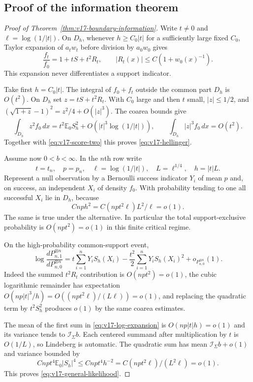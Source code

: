 \subsection{Proof of the information theorem}
\begin{proof}[Proof of Theorem~\ref{thm:v17-boundary-information}]
Write $t\ne0$ and $\ell=\log(1/|t|)$.  On $D_h$, whenever
$h\ge C_0|t|$ for a sufficiently large fixed $C_0$, Taylor expansion of
$a_tw_t$ before division by $a_0w_0$ gives
\begin{equation}\label{eq:v17-density-ratio}
 \frac{f_t}{f_0}=1+tS+t^2R_t,
 \qquad |R_t(x)|\le C(1+w_0(x)^{-1}).
\end{equation}
This expansion never differentiates a support indicator.

Take first $h=C_0|t|$.  The integral of $f_0+f_t$ outside the common part
$D_h$ is $O(t^2)$.  On $D_h$ set $z=tS+t^2R_t$.  With $C_0$ large and
then $t$ small, $|z|\le1/2$, and
$(\sqrt{1+z}-1)^2=z^2/4+O(|z|^3)$.  The coarea bounds give
\[
 \int_{D_h}z^2f_0\,dx
 =t^2\mathbb E_0S_h^2+O(|t|^3\log(1/|t|)),
 \qquad
 \int_{D_h}|z|^3f_0\,dx=O(t^2).
\]
Together with \eqref{eq:v17-score-two} this proves
\eqref{eq:v17-hellinger}.

Assume now $0<b<\infty$.  In the $n$th row write
\[
 t=t_n,\quad p=p_n,\quad \ell=\log(1/|t|),\quad
 L=\ell^{1/4},\quad h=|t|L.
\]
Represent a null observation by a Bernoulli success indicator $Y_i$ of
mean $p$ and, on success, an independent $X_i$ of density $f_0$.  With
probability tending to one all successful $X_i$ lie in $D_h$, because
\[
 Cnph^2=C(npt^2\ell)L^2/\ell=o(1).
\]
The same is true under the alternative.  In particular the total
support-exclusive probability is $O(npt^2)=o(1)$ in this finite critical
regime.

On the high-probability common-support event,
\begin{equation}\label{eq:v17-log-expansion}
 \log\frac{dP_{n,1}^{\otimes n}}{dP_{n,0}^{\otimes n}}
 =t\sum_{i=1}^nY_iS_h(X_i)
 -\frac{t^2}{2}\sum_{i=1}^nY_iS_h(X_i)^2+o_{P_{n,0}^{\otimes n}}(1).
\end{equation}
Indeed the summed $t^2R_t$ contribution is $O(npt^2)=o(1)$,
the cubic logarithmic remainder has expectation
$O(np|t|^3/h)=O((npt^2\ell)/(L\ell))=o(1)$, and replacing the quadratic
term by $t^2S_h^2$ produces $o(1)$ by the same coarea estimates.

The mean of the first sum in \eqref{eq:v17-log-expansion} is
$O(np|t|h)=o(1)$ and its variance tends to
$\mathcal I_\Sigma b$.  Each centered summand after multiplication by $t$
is $O(1/L)$, so Lindeberg is automatic.  The quadratic sum has mean
$\mathcal I_\Sigma b+o(1)$ and variance bounded by
\[
 Cnpt^4\mathbb E_0|S_h|^4
 \le Cnpt^4h^{-2}=C(npt^2\ell)/(L^2\ell)=o(1).
\]
This proves \eqref{eq:v17-general-likelihood}.


\end{proof}
